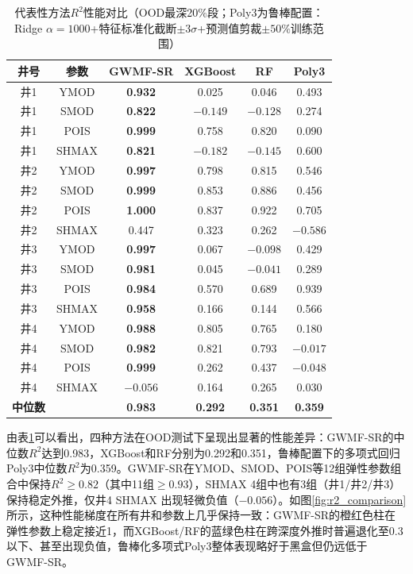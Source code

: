 \documentclass[a4paper,12pt]{ctexart}
\begin{document}
\begin{table}[htbp]
  \centering
  \caption{代表性方法$R^2$性能对比（OOD最深20\%段；Poly3为鲁棒配置：Ridge $\alpha=1000$+特征标准化截断$\pm 3\sigma$+预测值剪裁$\pm 50\%$训练范围）}
  \label{tab:comparison}
  \small
  \begin{tabular}{cccccc}
    \toprule
    井号 & 参数 & GWMF-SR & XGBoost & RF & Poly3 \\
    \midrule
    井1 & YMOD  & \textbf{0.932} & 0.025 & 0.046 & 0.493 \\
    井1 & SMOD  & \textbf{0.822} & $-0.149$ & $-0.128$ & 0.274 \\
    井1 & POIS  & \textbf{0.999} & 0.758 & 0.820 & 0.090 \\
    井1 & SHMAX & \textbf{0.821} & $-0.182$ & $-0.145$ & 0.600 \\
    \midrule
    井2 & YMOD  & \textbf{0.997} & 0.798 & 0.815 & 0.546 \\
    井2 & SMOD  & \textbf{0.999} & 0.853 & 0.886 & 0.456 \\
    井2 & POIS  & \textbf{1.000} & 0.837 & 0.922 & 0.705 \\
    井2 & SHMAX & 0.447          & 0.323 & 0.262 & $-0.586$ \\
    \midrule
    井3 & YMOD  & \textbf{0.997} & 0.067 & $-0.098$ & 0.429 \\
    井3 & SMOD  & \textbf{0.981} & 0.045 & $-0.041$ & 0.289 \\
    井3 & POIS  & \textbf{0.984} & 0.570 & 0.689 & 0.939 \\
    井3 & SHMAX & \textbf{0.958} & 0.166 & 0.144 & 0.566 \\
    \midrule
    井4 & YMOD  & \textbf{0.988} & 0.805 & 0.765 & 0.180 \\
    井4 & SMOD  & \textbf{0.982} & 0.821 & 0.793 & $-0.017$ \\
    井4 & POIS  & \textbf{0.999} & 0.262 & 0.437 & $-0.048$ \\
    井4 & SHMAX & $-0.056$ & 0.164 & 0.265 & 0.030 \\
    \midrule
    \textbf{中位数} & & \textbf{0.983} & \textbf{0.292} & \textbf{0.351} & \textbf{0.359} \\
    \bottomrule
  \end{tabular}
\end{table}

由表\ref{tab:comparison}可以看出，四种方法在OOD测试下呈现出显著的性能差异：GWMF-SR的中位数$R^2$达到0.983，XGBoost和RF分别为0.292和0.351，鲁棒配置下的多项式回归Poly3中位数$R^2$为0.359。GWMF-SR在YMOD、SMOD、POIS等12组弹性参数组合中保持$R^2 \geq 0.82$（其中11组$\geq 0.93$），SHMAX 4组中也有3组（井1/井2/井3）保持稳定外推，仅井4 SHMAX 出现轻微负值（$-0.056$）。如图\ref{fig:r2_comparison}所示，这种性能梯度在所有井和参数上几乎保持一致：GWMF-SR的橙红色柱在弹性参数上稳定接近1，而XGBoost/RF的蓝绿色柱在跨深度外推时普遍退化至0.3以下、甚至出现负值，鲁棒化多项式Poly3整体表现略好于黑盒但仍远低于GWMF-SR。
\end{document}
